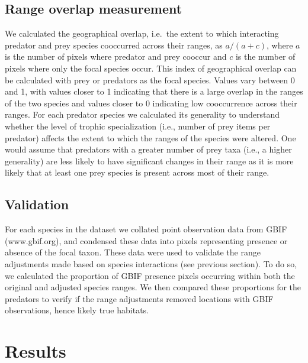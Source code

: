 \documentclass[10pt,oneside]{article}
\begin{document}
\hypertarget{range-overlap-measurement}{%
\subsection{Range overlap measurement}\label{range-overlap-measurement}}

We calculated the geographical overlap, i.e.~the extent to which
interacting predator and prey species cooccurred across their ranges, as
\(a/(a + c)\), where \(a\) is the number of pixels where predator and
prey cooccur and \(c\) is the number of pixels where only the focal
species occur. This index of geographical overlap can be calculated with
prey or predators as the focal species. Values vary between 0 and 1,
with values closer to 1 indicating that there is a large overlap in the
ranges of the two species and values closer to 0 indicating low
cooccurrence across their ranges. For each predator species we
calculated its generality to understand whether the level of trophic
specialization (i.e., number of prey items per predator) affects the
extent to which the ranges of the species were altered. One would assume
that predators with a greater number of prey taxa (i.e., a higher
generality) are less likely to have significant changes in their range
as it is more likely that at least one prey species is present across
most of their range.

\hypertarget{validation}{%
\subsection{Validation}\label{validation}}

For each species in the dataset we collated point observation data from
GBIF (www.gbif.org), and condensed these data into pixels representing
presence or absence of the focal taxon. These data were used to validate
the range adjustments made based on species interactions (see previous
section). To do so, we calculated the proportion of GBIF presence pixels
occurring within both the original and adjusted species ranges. We then
compared these proportions for the predators to verify if the range
adjustments removed locations with GBIF observations, hence likely true
habitats.

\hypertarget{results}{%
\section{Results}\label{results}}
\end{document}
